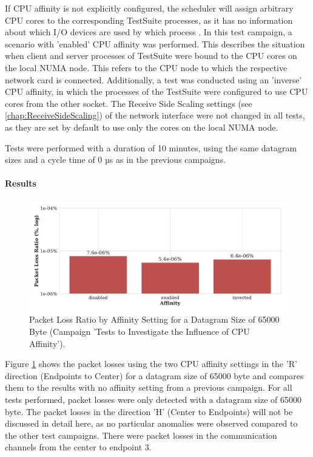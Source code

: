If CPU affinity is not explicitly configured, the scheduler will assign arbitrary CPU cores to the corresponding TestSuite processes, as it has no information about which I/O devices are used by which process \cite{reli07}. In this test campaign, a scenario with 'enabled' CPU affinity was performed. This describes the situation when client and server processes of TestSuite were bound to the CPU cores on the local NUMA node. This refers to the CPU node to which the respective network card is connected. Additionally, a test was conducted using an 'inverse' CPU affinity, in which the processes of the TestSuite were configured to use CPU cores from the other socket. The Receive Side Scaling settings (see \ref{chap:ReceiveSideScaling}) of the network interface were not changed in all tests, as they are set by default to use only the cores on the local NUMA node.

Tests were performed with a duration of 10 minutes, using the same datagram sizes and a cycle time of 0 µs as in the previous campaigns.

\paragraph{Results}

\begin{figure}[h]
    \centering
    \includegraphics[width=1\linewidth]{figures/reliability/ihawk/diagr9.pdf}
    \caption{Packet Loss Ratio by Affinity Setting for a Datagram Size of 65000 Byte (Campaign 'Tests to Investigate the Influence of CPU Affinity').}
    \label{fig:diagr9Loss}
\end{figure}

Figure \ref{fig:diagr9Loss} shows the packet losses using the two CPU affinity settings in the 'R' direction (Endpoints to Center) for a datagram size of 65000 byte and compares them to the results with no affinity setting from a previous campaign. For all tests performed, packet losses were only detected with a datagram size of 65000 byte. The packet losses in the direction 'H' (Center to Endpoints) will not be discussed in detail here, as no particular anomalies were observed compared to the other test campaigns. There were packet losses in the communication channels from the center to endpoint 3.

